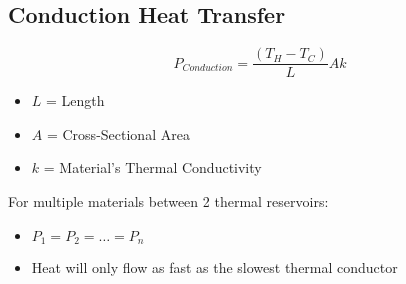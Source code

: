 \subsection{Conduction Heat Transfer}\label{subsec:Conduction Heat Transfer}
\begin{equation}\label{eq:Conduction Heat Transfer}
  P_{Conduction} = \frac{\left( T_{H} - T_{C} \right)}{L} Ak
\end{equation}
\begin{itemize}[noitemsep, nolistsep]
\item $L$ = Length
\item $A$ = Cross-Sectional Area
\item $k$ = Material's Thermal Conductivity
\end{itemize}
For multiple materials between 2 thermal reservoirs:
\begin{itemize}[noitemsep, nolistsep]
\item $P_{1} = P_{2} = \ldots = P_{n}$
\item Heat will only flow as fast as the slowest thermal conductor
\end{itemize}
